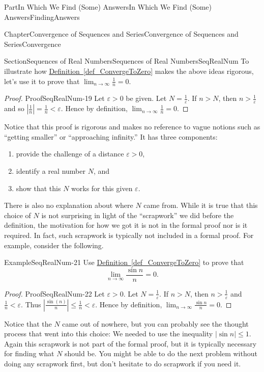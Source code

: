 \documentclass[oneside,10pt,]{book}
\newcommand{\xreffont}{\relax}
\numberwithin{equation}{part}
\newcommand{\abs}[1]{\left|#1\right|}
\def\limit#1#2#3{{\displaystyle\lim_{#1\rightarrow #2}#3}}
\def\limitt#1#2#3{{\displaystyle\lim_{#1\rightarrow #2}\textstyle #3}}
\newcommand{\eps}{\varepsilon}
\newcommand{\lt}{<}
\begin{document}
\begin{partptx}{Part}{In Which We Find (Some) Answers}{}{In Which We Find (Some) Answers}{}{}{FindingAnswers}
\begin{chapterptx}{Chapter}{Convergence of Sequences and Series}{}{Convergence of Sequences and Series}{}{}{Convergence}
\begin{sectionptx}{Section}{Sequences of Real Numbers}{}{Sequences of Real Numbers}{}{}{SeqRealNum}
To illustrate how \hyperref[def_ConvergeToZero]{Definition~{\xreffont\ref{def_ConvergeToZero}}} makes the above ideas rigorous, let's use it to prove that \(\limit{n}{\infty}{\textstyle\frac{1}{n}}=0\).%
\begin{proof}{Proof}{}{SeqRealNum-19}
Let \(\eps>0\) be given. Let \(N=\frac{1}{\eps}\). If \(n>N\), then \(n>\frac{1}{\eps}\) and so \(\abs{\frac{1}{n}}=\frac{1}{n}\lt \eps\). Hence by definition, \(\limitt{n}{\infty}{\frac{1}{n}}=0\).%
\end{proof}
Notice that this proof is rigorous and makes no reference to vague notions such as ``getting smaller'' or ``approaching infinity.'' It has three components:%
\begin{enumerate}
\item{}provide the challenge of a distance \(\eps>0\),%
\item{}identify a real number \(N\), and%
\item{}show that this \(N\) works for this given \(\eps\).%
\end{enumerate}
There is also no explanation about where \(N\) came from. While it is true that this choice of \(N\) is not surprising in light of the ``scrapwork'' we did before the definition, the motivation for how we got it is not in the formal proof nor is it required.  In fact, such scrapwork is typically not included in a formal proof.  For example, consider the following.%
\begin{example}{Example}{}{SeqRealNum-21}%
Use \hyperref[def_ConvergeToZero]{Definition~{\xreffont\ref{def_ConvergeToZero}}} to prove that%
\begin{equation*}
\limit{n}{\infty}{\frac{\sin n}{n}}=0\text{.}
\end{equation*}
%
\end{example}
\begin{proof}{Proof}{}{SeqRealNum-22}
Let \(\eps>0\). Let \(N=\frac{1}{\eps}\). If \(n>N\), then \(n>\frac{1}{\eps}\) and \(\frac{1}{n}\lt \eps\). Thus \(\abs{\frac{\sin(n)}{n}}\leq\frac{1}{n}\lt \eps\). Hence by definition, \(\limitt{n}{\infty}{\frac{\sin n}{n}}=0\).%
\end{proof}
Notice that the \(N\) came out of nowhere, but you can probably see the thought process that went into this choice: We needed to use the inequality \(\abs{\sin n}\leq 1\). Again this scrapwork is not part of the formal proof, but it is typically necessary for finding what \(N\) should be. You might be able to do the next problem without doing any scrapwork first, but don't hesitate to do scrapwork if you need it.%

\end{sectionptx}
\end{chapterptx}
\end{partptx}
\end{document}
